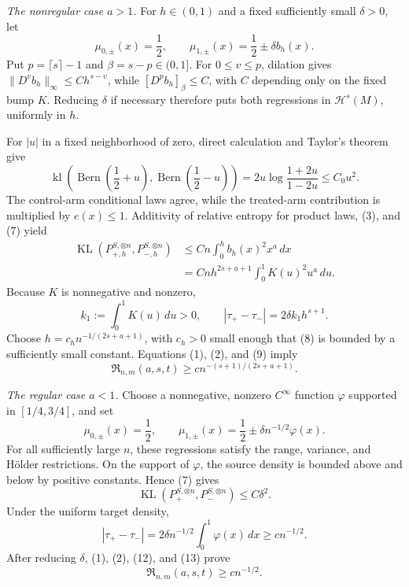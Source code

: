 \emph{The nonregular case \(a>1\).}
For \(h\in(0,1)\) and a fixed sufficiently small \(\delta>0\), let
\[
 \mu_{0,\pm}(x)=\frac12,
 \qquad
 \mu_{1,\pm}(x)=\frac12\pm\delta b_h(x).
\tag{6}
\]
Put \(p=\lceil s\rceil-1\) and \(\beta=s-p\in(0,1]\).  For \(0\le v\le p\), dilation gives \(\lVert D^v b_h\rVert_\infty\le C h^{s-v}\), while \([D^p b_h]_{\beta}\le C\), with \(C\) depending only on the fixed bump \(K\).  Reducing \(\delta\) if necessary therefore puts both regressions in \(\mathcal H^s(M)\), uniformly in \(h\).

For \(|u|\) in a fixed neighborhood of zero, direct calculation and Taylor's theorem give
\[
 \operatorname{kl}\!\left(
  \operatorname{Bern}\!\left(\frac12+u\right),
  \operatorname{Bern}\!\left(\frac12-u\right)
 \right)
 =2u\log\frac{1+2u}{1-2u}
 \le C_0u^2.
\tag{7}
\]
The control-arm conditional laws agree, while the treated-arm contribution is multiplied by \(e(x)\le1\).  Additivity of relative entropy for product laws, (3), and (7) yield
\[
 \begin{aligned}
 \operatorname{KL}(P_{+,h}^{S,\otimes n},P_{-,h}^{S,\otimes n})
 &\le Cn\int_0^h b_h(x)^2x^a\,dx\\
 &=Cnh^{2s+a+1}\int_0^1K(u)^2u^a\,du.
 \end{aligned}
\tag{8}
\]
Because \(K\) is nonnegative and nonzero,
\[
 k_1:=\int_0^1K(u)\,du>0,
 \qquad
 |\tau_+-\tau_-|=2\delta k_1h^{s+1}.
\tag{9}
\]
Choose \(h=c_hn^{-1/(2s+a+1)}\), with \(c_h>0\) small enough that (8) is bounded by a sufficiently small constant.  Equations (1), (2), and (9) imply
\[
 \mathfrak R_{n,m}(a,s,t)
 \ge c n^{-(s+1)/(2s+a+1)}.
\tag{10}
\]

\emph{The regular case \(a<1\).}
Choose a nonnegative, nonzero \(C^\infty\) function \(\varphi\) supported in \([1/4,3/4]\), and set
\[
 \mu_{0,\pm}(x)=\frac12,
 \qquad
 \mu_{1,\pm}(x)=\frac12\pm\delta n^{-1/2}\varphi(x).
\tag{11}
\]
For all sufficiently large \(n\), these regressions satisfy the range, variance, and H\"older restrictions.  On the support of \(\varphi\), the source density is bounded above and below by positive constants.  Hence (7) gives
\[
 \operatorname{KL}(P_+^{S,\otimes n},P_-^{S,\otimes n})
 \le C\delta^2.
\tag{12}
\]
Under the uniform target density,
\[
 |\tau_+-\tau_-|
 =2\delta n^{-1/2}\int_0^1\varphi(x)\,dx
 \ge c n^{-1/2}.
\tag{13}
\]
After reducing \(\delta\), (1), (2), (12), and (13) prove
\[
 \mathfrak R_{n,m}(a,s,t)\ge c n^{-1/2}.
\tag{14}
\]

